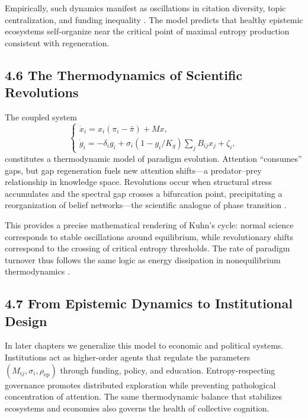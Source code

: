 \documentclass[11pt,a4paper,titlepage]{article}
\theoremstyle{definition}
\begin{document}
Empirically, such dynamics manifest as oscillations in citation diversity,
topic centralization, and funding inequality \cite{fortunato2018,evans2011}.
The model predicts that healthy epistemic ecosystems self-organize near the
critical point of maximal entropy production consistent with regeneration.

\subsection{4.6 The Thermodynamics of Scientific Revolutions}

The coupled system
\begin{equation}
\begin{cases}
\dot{x}_i = x_i (\pi_i - \bar{\pi}) + Mx,\\
\dot{g}_i = -\delta_i g_i + \sigma_i(1 - g_i/K_g)\sum_j B_{ij}x_j + \zeta_i,
\end{cases}
\label{eq:epistemic_coupled}
\end{equation}
constitutes a thermodynamic model of paradigm evolution.
Attention “consumes” gaps, but gap regeneration fuels new attention shifts—a
predator–prey relationship in knowledge space.
Revolutions occur when structural stress accumulates and the spectral gap
crosses a bifurcation point, precipitating a reorganization of belief
networks—the scientific analogue of phase transition
\cite{kuhn1962,holland2012}.

This provides a precise mathematical rendering of Kuhn’s cycle:
normal science corresponds to stable oscillations around equilibrium,
while revolutionary shifts correspond to the crossing of critical entropy
thresholds.  The rate of paradigm turnover thus follows the same logic as
energy dissipation in nonequilibrium thermodynamics \cite{prigogine1984}.

\subsection{4.7 From Epistemic Dynamics to Institutional Design}

In later chapters we generalize this model to economic and political systems.
Institutions act as higher-order agents that regulate the parameters
$(M_{ij}, \sigma_i, \rho_{\text{ep}})$ through funding, policy, and education.
Entropy-respecting governance promotes distributed exploration while preventing
pathological concentration of attention.
The same thermodynamic balance that stabilizes ecosystems and economies
also governs the health of collective cognition.
\end{document}
